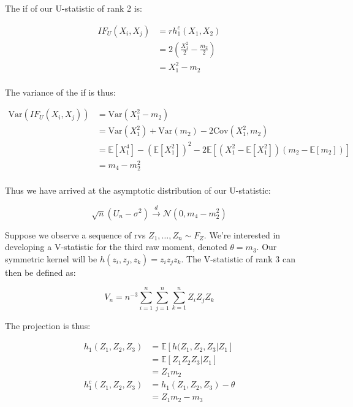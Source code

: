 \documentclass{report}
\begin{document}
The \gls{if} of our U-statistic of rank 2 is:

\begin{equation}\label{eq:ex-lst-u-statistic-variance-if}
    \begin{aligned}
        IF_U(X_i, X_j)
          &= rh_1^c(X_1, X_2) \\
          &= 2 \left(\frac{X_1^2}{2} - \frac{m_2}{2}\right) \\
          &= X_1^2 - m_2 \\
    \end{aligned}
\end{equation}

The variance of the \gls{if} is thus:

\begin{equation}\label{eq:ex-lst-u-statistic-variance-if-variance}
    \begin{aligned}
        \text{Var}\left(IF_U(X_i, X_j)\right)
          &= \text{Var}(X_1^2 - m_2) \\
          &= \text{Var}(X_1^2) + \text{Var}(m_2) - 2\text{Cov}(X_1^2, m_2) \\
          &= \mathbb{E}[X_1^4] - \left(\mathbb{E}[X_1^2]\right)^2 - 2\mathbb{E}[(X_1^2 - \mathbb{E}[X_1^2])(m_2 - \mathbb{E}[m_2])] \\
          &= m_4 - m_2^2 \\
    \end{aligned}
\end{equation}

Thus we have arrived at the asymptotic distribution of our U-statistic:

\begin{equation}\label{eq:ex-lst-u-statistic-variance-asymptotics}
    \sqrt{n}(U_n - \sigma^2) \overset{d}{\to} \mathcal{N}(0, m_4 - m_2^2)
\end{equation}

Suppose we observe a sequence of \glspl{rv} $Z_1, \dots, Z_n \sim F_Z$. We're interested in developing a V-statistic for the third raw moment, denoted $\theta = m_3$. Our symmetric kernel will be $h(z_i, z_j, z_k) = z_iz_jz_k$. The V-statistic of rank 3 can then be defined as:

\begin{equation}\label{eq:ex-lst-v-statistic-m3}
    V_n = n^{-3} \sum_{i=1}^n \sum_{j=1}^n \sum_{k=1}^n Z_iZ_jZ_k
\end{equation}

The projection is thus:

\begin{equation}\label{eq:ex-lst-v-statistic-m3-projection}
    \begin{aligned}
        h_1(Z_1, Z_2, Z_3) 
          &= \mathbb{E}[h(Z_1, Z_2, Z_3 | Z_1] \\
          &= \mathbb{E}[Z_1Z_2Z_3 | Z_1] \\
          &= Z_1m_2 \\
        h_1^c(Z_1, Z_2, Z_3)
          &= h_1(Z_1, Z_2, Z_3) - \theta \\
          &= Z_1m_2 - m_3 \\
    \end{aligned}
\end{equation}
\end{document}
